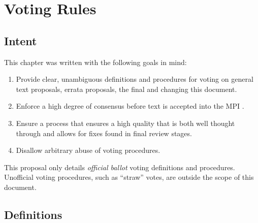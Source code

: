 \chapter{Voting Rules}


\section{Intent}

This chapter was written with the following goals in mind:

\begin{enumerate}
\item Provide clear, unambiguous definitions and procedures for voting
  on general text proposals, errata proposals, the final {\color{red}{MPI Standard Document}} and changing this
  document.
\item Enforce a high degree of consensus before text is accepted into
  the MPI {\color{red}{Standard Document}}.
\item Ensure a process that ensures a high quality {\color{red}{MPI Standard Document}} that is both well thought through and allows for fixes found in final review stages.
\item Disallow arbitrary abuse of voting procedures.
\end{enumerate}

This proposal only details {\em official ballot} voting definitions
and procedures.  Unofficial voting procedures, such as ``straw''
votes, are outside the scope of this document.


\section{Definitions}

